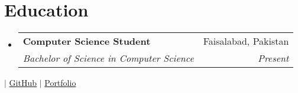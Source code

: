 \documentclass[letterpaper,11pt]{article}
\makeatletter
\newcommand{\resumeSubheading}[4]{
  \vspace{-2pt}\item
    \begin{tabular*}{0.97\textwidth}[t]{l@{\extracolsep{\fill}}r}
      \textbf{#1} & #2 \\
      \textit{\small#3} & \textit{\small #4} \\
    \end{tabular*}\vspace{-7pt}
}
\newcommand{\resumeSubHeadingListStart}{\begin{itemize}[leftmargin=0.15in, label={}]}
\newcommand{\resumeSubHeadingListEnd}{\end{itemize}}
\makeatother
\begin{document}
\section{Education}
\resumeSubHeadingListStart
\resumeSubheading{Computer Science Student}{Faisalabad, Pakistan}{Bachelor of Science in Computer Science}{Present}
\resumeSubHeadingListEnd

\begin{center}
\small  $|$ \href{https://github.com/danishmustafa86}{GitHub} $|$ \href{}{Portfolio}
\end{center}
\end{document}
